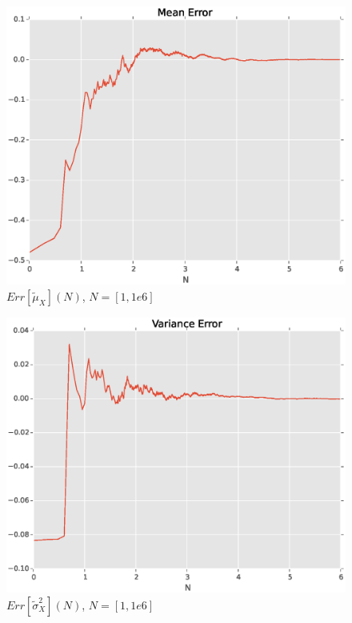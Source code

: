 \begin{figure}[H] 
	\centering 
	\includegraphics[width=\linewidth]{figure_1}
	\caption{$Err[\tilde{\mu}_X](N)$, $N = [1, 1e6]$}
	\label{fig: meanerror} 
\end{figure}

\begin{figure}[H] 
	\centering 
	\includegraphics[width=\linewidth]{figure_2}
	\caption{$Err[\tilde{\sigma}^2_X](N)$, $N = [1, 1e6]$}
	\label{fig: varerror} 
\end{figure}

